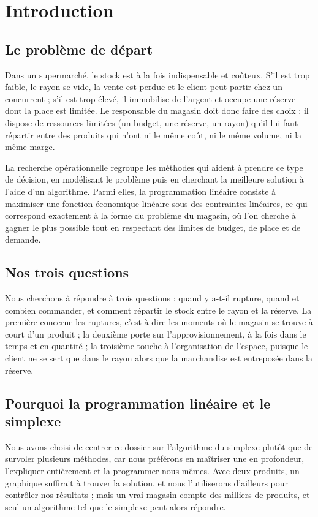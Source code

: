 \documentclass[11pt,a4paper]{article}
\begin{document}
\section{Introduction}

\subsection{Le problème de départ}
Dans un supermarché, le stock est à la fois indispensable et coûteux. S'il est trop faible,
le rayon se vide, la vente est perdue et le client peut partir chez un concurrent ; s'il est
trop élevé, il immobilise de l'argent et occupe une réserve dont la place est limitée. Le
responsable du magasin doit donc faire des choix : il dispose de ressources limitées (un
budget, une réserve, un rayon) qu'il lui faut répartir entre des produits qui n'ont ni le
même coût, ni le même volume, ni la même marge.

La recherche opérationnelle regroupe les méthodes qui aident à prendre ce type de décision,
en modélisant le problème puis en cherchant la meilleure solution à l'aide d'un algorithme.
Parmi elles, la programmation linéaire consiste à maximiser une fonction économique linéaire
sous des contraintes linéaires, ce qui correspond exactement à la forme du problème du
magasin, où l'on cherche à gagner le plus possible tout en respectant des limites de budget,
de place et de demande.

\subsection{Nos trois questions}
Nous cherchons à répondre à trois questions : quand y a-t-il rupture, quand et combien
commander, et comment répartir le stock entre le rayon et la réserve. La première concerne
les ruptures, c'est-à-dire les moments où le magasin se trouve à court d'un produit ; la
deuxième porte sur l'approvisionnement, à la fois dans le temps et en quantité ; la troisième
touche à l'organisation de l'espace, puisque le client ne se sert que dans le rayon alors que
la marchandise est entreposée dans la réserve.

\subsection{Pourquoi la programmation linéaire et le simplexe}
Nous avons choisi de centrer ce dossier sur l'algorithme du simplexe plutôt que de survoler
plusieurs méthodes, car nous préférons en maîtriser une en profondeur, l'expliquer
entièrement et la programmer nous-mêmes. Avec deux produits, un graphique suffirait à trouver
la solution, et nous l'utiliserons d'ailleurs pour contrôler nos résultats ; mais un vrai
magasin compte des milliers de produits, et seul un algorithme tel que le simplexe peut alors
répondre.
\end{document}
